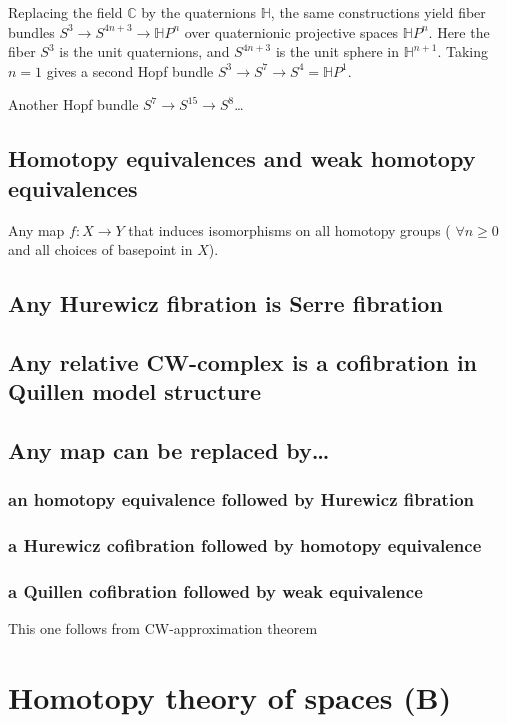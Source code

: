 \begin{example}
	Replacing the field $\mathbb{C}$ by the quaternions $\mathbb{H}$, the same constructions yield fiber bundles $S^3\to S^{4n+3}\to\mathbb{H} P^{n}$ over quaternionic projective spaces $\mathbb{H} P^n$. Here the fiber $S^3$ is the unit quaternions, and $S^{4n+3}$ is the unit sphere in $\mathbb{H}^{n+1}$. Taking $n=1$ gives a second Hopf bundle $S^3\to S^7\to S^4=\mathbb{H} P^1$.
	
	Another Hopf bundle $S^7\to S^{15}\to S^8$…
\end{example}

\subsection{Homotopy equivalences and weak homotopy equivalences}

\begin{defn}
	Any map $f:X\to Y$ that induces isomorphisms on all homotopy groups ( $\forall n\geq 0$ and all choices of basepoint in $X$).
\end{defn}

\subsection*{Any Hurewicz fibration is Serre fibration}
\subsection*{Any relative CW-complex is a cofibration in Quillen model structure}
\subsection*{Any map can be replaced by…} 
\subsubsection*{an homotopy equivalence followed by Hurewicz fibration}
\subsubsection*{a Hurewicz cofibration followed by homotopy equivalence}
\subsubsection*{a Quillen cofibration followed by weak equivalence}
This one follows from CW-approximation theorem

\section*{Homotopy theory  of spaces (B)}

